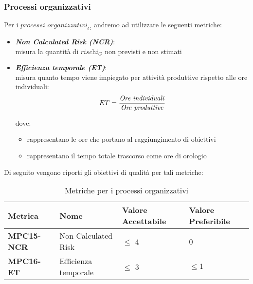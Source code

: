 \subsubsection{Processi organizzativi}
Per i $\textit{processi organizzativi}_G$ andremo ad utilizzare le seguenti metriche:
\begin{itemize}
    \item \textbf{\emph{Non Calculated Risk (NCR)}}:\\
    misura la quantità di $\textit{rischi}_G$ non previsti e non stimati
    \item \textbf{\emph{Efficienza temporale (ET)}}:\\
    misura quanto tempo viene impiegato per attività produttive rispetto alle ore individuali:
    \[
    ET = \frac{\text{\emph{Ore individuali}}}{\text{\emph{{Ore produttive}}}}
    \]

    dove:
    \begin{itemize}
        \item {} rappresentano le ore che portano al raggiungimento di obiettivi
        \item {} rappresentano il tempo totale trascorso come ore di orologio
    \end{itemize}
    \end{itemize}
Di seguito vengono riporti gli obiettivi di qualità per tali metriche:
\begin{table}[htbp]
    \centering
    \begin{tabular}{|>{\centering\arraybackslash}p{4cm}|p{4cm}|p{4cm}|p{4cm}|}
    \hline
    \rowcolor{gray!30}
    \textbf{Metrica} & \textbf{Nome} & \textbf{Valore Accettabile} & \textbf{Valore Preferibile} \\
    \hline
    \rowcolor{gray!10}
    \textbf{MPC15-NCR} & Non Calculated Risk & $\leq$ 4 & 0 \\
    \hline
    \rowcolor{gray!10}
    \textbf{MPC16-ET} & Efficienza temporale & $\leq$ 3 & $\leq 1$ \\
    \hline
    \end{tabular}
    \caption{Metriche per i processi organizzativi}
    \label{tab:metriche_fornitura}
\end{table}


